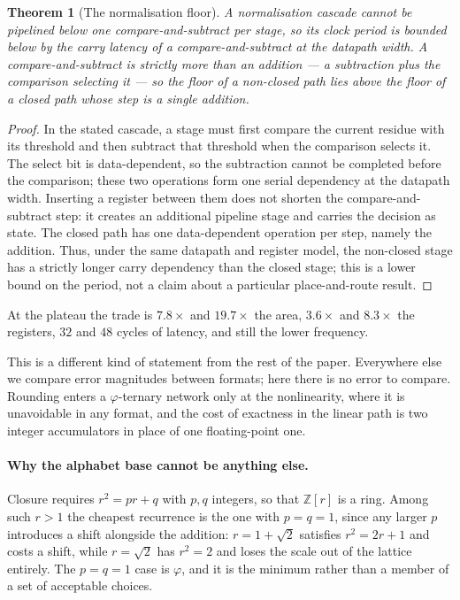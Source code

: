 \documentclass[11pt]{article}
\newtheorem{theorem}{Theorem}
\theoremstyle{definition}
\begin{document}
\begin{theorem}[The normalisation floor]\label{thm:normfloor}
A normalisation cascade cannot be pipelined below one compare-and-subtract per
stage, so its clock period is bounded below by the carry latency of a
compare-and-subtract at the datapath width. A compare-and-subtract is strictly
more than an addition --- a subtraction plus the comparison selecting it --- so
the floor of a non-closed path lies above the floor of a closed path whose step
is a single addition.
\end{theorem}
\begin{proof}
In the stated cascade, a stage must first compare the current residue with its
threshold and then subtract that threshold when the comparison selects it.
The select bit is data-dependent, so the subtraction cannot be completed before
the comparison; these two operations form one serial dependency at the
datapath width. Inserting a register between them does not shorten the
compare-and-subtract step: it creates an additional pipeline stage and carries
the decision as state. The closed path has one data-dependent operation per
step, namely the addition. Thus, under the same datapath and register model,
the non-closed stage has a strictly longer carry dependency than the closed
stage; this is a lower bound on the period, not a claim about a particular
place-and-route result.
\end{proof}

At the plateau the trade is $7.8\times$ and $19.7\times$ the area,
$3.6\times$ and $8.3\times$ the registers, $32$ and $48$ cycles of latency, and
still the lower frequency.


This is a different kind of statement from the rest of the paper. Everywhere else
we compare error magnitudes between formats; here there is no error to compare.
Rounding enters a $\varphi$-ternary network only at the nonlinearity, where it is
unavoidable in any format, and the cost of exactness in the linear path is two
integer accumulators in place of one floating-point one.

\paragraph{Why the alphabet base cannot be anything else.} Closure requires
$r^{2} = pr + q$ with $p,q$ integers, so that $\mathbb{Z}[r]$ is a ring. Among
such $r>1$ the cheapest recurrence is the one with $p=q=1$, since any larger $p$
introduces a shift alongside the addition: $r = 1+\sqrt2$ satisfies
$r^2 = 2r+1$ and costs a shift, while $r=\sqrt2$ has $r^2 = 2$ and loses the
scale out of the lattice entirely. The $p=q=1$ case is $\varphi$, and it is the
minimum rather than a member of a set of acceptable choices.
\end{document}
